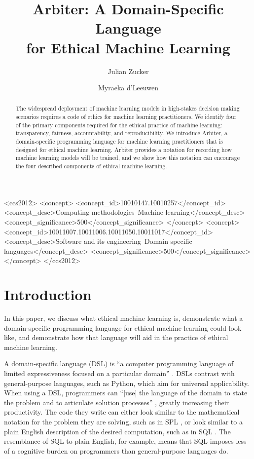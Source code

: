 \documentclass[sigconf]{acmart}
\title{Arbiter: A Domain-Specific Language \\for Ethical Machine Learning}
\author{Julian Zucker}
\affiliation{%
    \institution{Northeastern University}
}
\author{Myraeka d'Leeuwen}
\affiliation{%
    \institution{Northeastern University}
}
\begin{document}
\fancyhead{}
\begin{abstract}
The widespread deployment of machine learning models in high-stakes decision making scenarios requires a code of ethics for machine learning practitioners. We identify four of the primary components required for the ethical practice of machine learning: transparency, fairness, accountability, and reproducibility. We introduce Arbiter, a domain-specific programming language for machine learning practitioners that is designed for ethical machine learning. Arbiter provides a notation for recording how machine learning models will be trained, and we show how this notation can encourage the four described components of ethical machine learning.
\end{abstract}

\begin{CCSXML}
<ccs2012>
<concept>
<concept_id>10010147.10010257</concept_id>
<concept_desc>Computing methodologies~Machine learning</concept_desc>
<concept_significance>500</concept_significance>
</concept>
<concept>
<concept_id>10011007.10011006.10011050.10011017</concept_id>
<concept_desc>Software and its engineering~Domain specific languages</concept_desc>
<concept_significance>500</concept_significance>
</concept>
</ccs2012>
\end{CCSXML}




\maketitle

\section{Introduction}
In this paper, we discuss what ethical machine learning is, demonstrate what a domain-specific programming language for ethical machine learning could look like, and demonstrate how that language will aid in the practice of ethical machine learning.

A domain-specific language (DSL) is ``a computer programming language of limited expressiveness focused on a particular domain'' \citep{Fowler2010}. DSLs contrast with general-purpose languages, such as Python, which aim for universal applicability. When using a DSL, programmers can ``[use] the language of the domain to state the problem and to articulate solution processes'' \citep{Felleisen2015}, greatly increasing their productivity. The code they write can either look similar to the mathematical notation for the problem they are solving, such as in SPL \citep{Werk2012}, or look similar to a plain English description of the desired computation, such as in SQL \citep{Date1997}. The resemblance of SQL to plain English, for example, means that SQL imposes less of a cognitive burden on programmers than general-purpose languages do.
\end{document}
